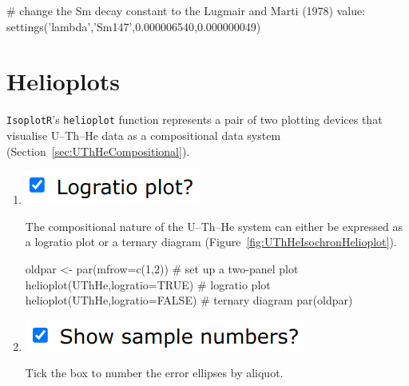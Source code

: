 \begin{refsection}
\begin{script}
# change the Sm decay constant to the Lugmair and Marti (1978) value:
settings('lambda','Sm147',0.000006540,0.000000049)
\end{script}

\section{Helioplots}\label{sec:helioplot-R}

\texttt{IsoplotR}'s \texttt{helioplot} function represents a pair of
two plotting devices that visualise U--Th--He data as a compositional
data system (Section~\ref{sec:UThHeCompositional}).

\begin{enumerate}
  
\item \noindent\begin{minipage}[t]{.18\linewidth}
\strut\vspace*{-\baselineskip}\newline
\includegraphics[width=\linewidth]{../figures/UThHelioplotLogratio.png}
\end{minipage}
\begin{minipage}[t]{.82\linewidth}
  The compositional nature of the U--Th--He system can either be
  expressed as a logratio plot or a ternary diagram
  (Figure~\ref{fig:UThHeIsochronHelioplot}).\\
\end{minipage}

\begin{script}
oldpar <- par(mfrow=c(1,2)) # set up a two-panel plot
helioplot(UThHe,logratio=TRUE)  # logratio plot
helioplot(UThHe,logratio=FALSE) # ternary diagram
par(oldpar)
\end{script}

\item \noindent\begin{minipage}[t]{.28\linewidth}
\strut\vspace*{-\baselineskip}\newline
\includegraphics[width=\linewidth]{../figures/UThHeshownumbers.png}
\end{minipage}
\begin{minipage}[t]{.72\linewidth}
Tick the box to number the error ellipses by aliquot.\\
\end{minipage}


\end{enumerate}
\end{refsection}
